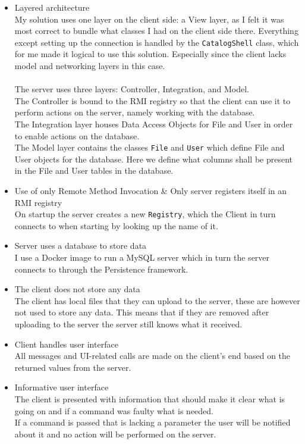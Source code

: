 \documentclass[a4paper]{scrartcl}
\begin{document}
\begin{itemize}
	\item{
		Layered architecture\\
		My solution uses one layer on the client side: a View layer, as I felt it was most correct to bundle what classes I had on the client side there. Everything except setting up the connection is handled by the \texttt{CatalogShell} class, which for me made it logical to use this solution. Especially since the client lacks model and networking layers in this case.\\
		\\
		The server uses three layers: Controller, Integration, and Model.\\
		The Controller is bound to the RMI registry so that the client can use it to perform actions on the server, namely working with the database.\\
		The Integration layer houses Data Access Objects for File and User in order to enable actions on the database.\\
		The Model layer contains the classes \texttt{File} and \texttt{User} which define File and User objects for the database. Here we define what columns shall be present in the File and User tables in the database.
	}
	\item{
		Use of only Remote Method Invocation \& Only server registers itself in an RMI registry\\
		On startup the server creates a new \texttt{Registry}, which the Client in turn connects to when starting by looking up the name of it.	\\
	}
	\item{
		Server uses a database to store data\\
		I use a Docker image to run a MySQL server which in turn the server connects to through the Persistence framework.
	}
	\item{
		The client does not store any data\\
		The client has local files that they can upload to the server, these are however not used to store any data. This means that if they are removed after uploading to the server the server still knows what it received.
	}
	\item{
		Client handles user interface\\
		All messages and UI-related calls are made on the client's end based on the returned values from the server.
	}
	\item{
		Informative user interface\\
		The client is presented with information that should make it clear what is going on and if a command was faulty what is needed.\\
		If a command is passed that is lacking a parameter the user will be notified about it and no action will be performed on the server.
	}
\end{itemize}
\end{document}
